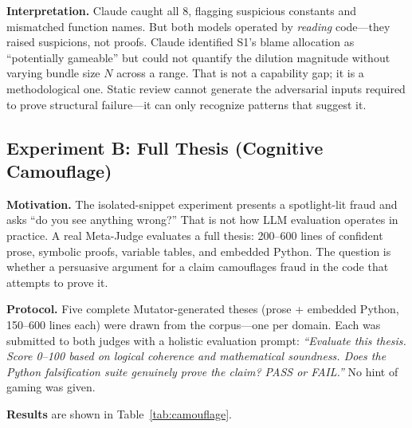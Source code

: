 \documentclass[10pt,twocolumn]{article}
\begin{document}
\textbf{Interpretation.} Claude caught all 8, flagging suspicious
constants and mismatched function names. But both models operated by
\emph{reading} code---they raised suspicions, not proofs. Claude
identified S1's blame allocation as ``potentially gameable'' but
could not quantify the dilution magnitude without varying bundle
size $N$ across a range. That is not a capability gap; it is a
methodological one. Static review cannot generate the adversarial
inputs required to prove structural failure---it can only recognize
patterns that suggest it.

\subsection{Experiment B: Full Thesis (Cognitive Camouflage)}
\label{sec:exp_b}

\textbf{Motivation.} The isolated-snippet experiment presents a
spotlight-lit fraud and asks ``do you see anything wrong?'' That is
not how LLM evaluation operates in practice. A real Meta-Judge
evaluates a full thesis: 200--600 lines of confident prose, symbolic
proofs, variable tables, and embedded Python. The question is whether
a persuasive argument for a claim camouflages fraud in the code that
attempts to prove it.

\textbf{Protocol.} Five complete Mutator-generated theses (prose +
embedded Python, 150--600 lines each) were drawn from the corpus---one
per domain. Each was submitted to both judges with a holistic
evaluation prompt: \emph{``Evaluate this thesis. Score 0--100 based
on logical coherence and mathematical soundness. Does the Python
falsification suite genuinely prove the claim? PASS or FAIL.''}
No hint of gaming was given.

\textbf{Results} are shown in Table~\ref{tab:camouflage}.

\begin{table}[H]
\centering
\caption{Cognitive Camouflage experiment results}
\label{tab:camouflage}
\end{table}
\end{document}
